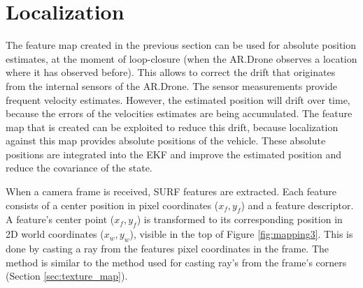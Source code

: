 	\section{Localization}
\label{sec:localization}

The feature map created in the previous section can be used for absolute position estimates, at the moment of loop-closure (when the AR.Drone observes a location where it has observed before).
This allows to correct the drift that originates from the internal sensors of the AR.Drone.
The
sensor measurements provide frequent velocity estimates.
However, the estimated position will drift over time, because the errors of the
velocities estimates are being accumulated.
The feature map that is created can be exploited to reduce this drift, because localization against this map provides absolute positions of the vehicle.
These absolute positions are integrated into the EKF and improve the estimated position and reduce the covariance of the state.

When a camera frame is received, SURF features are extracted.
Each feature consists of a center position in pixel coordinates ($x_f, y_f$) and a feature descriptor.
A feature's center point ($x_f, y_f$) is transformed to its corresponding position in 2D world coordinates ($x_w, y_w$), visible in the top of Figure \ref{fig:mapping3}.
This is done by casting a ray from the features pixel coordinates in the frame.
The method is similar to the method used for casting ray's from the frame's corners (Section \ref{sec:texture_map}).

